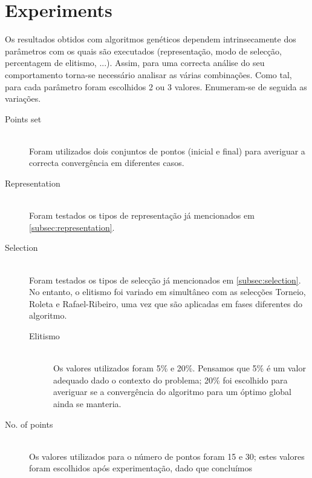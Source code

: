 \documentclass[a4paper]{article}
\begin{document}
\cleardoublepage

\section{Experiments}
\label{sec:experiments}
\indent \indent Os resultados obtidos com algoritmos genéticos dependem intrinsecamente dos parâmetros com os quais são executados
(representação, modo de selecção, percentagem de elitismo, ...). Assim, para uma correcta análise do seu comportamento
torna-se necessário analisar as várias combinações. Como tal, para cada parâmetro foram escolhidos 2 ou 3 valores.
Enumeram-se de seguida as variações.

\begin{description}
	\item [Points set] \hfill \\
		\indent Foram utilizados dois conjuntos de pontos (inicial e final) para averiguar a correcta convergência em diferentes casos.
			\begin{description}
				\item \[ P_{init} = (0.0, 3.0),\quad P_{final} = (4.0, 2.0) \]
				\item \[ P_{init} = (0.0, 3.0),\quad P_{final} = (4.0, 2.8) \]
			\end{description}
	\item [Representation] \hfill \\
		\indent Foram testados os tipos de representação já mencionados em \ref{subsec:representation}.
	\item [Selection] \hfill \\
		\indent Foram testados os tipos de selecção já mencionados em \ref{subsec:selection}. No entanto, o elitismo foi variado em simultâneo com
		as selecções Torneio, Roleta e Rafael-Ribeiro, uma vez que são aplicadas em fases diferentes do algoritmo.
	\begin{description}
		\item [Elitismo] \hfill \\
			\indent Os valores utilizados foram 5\% e 20\%. Pensamos que 5\% é um valor adequado dado o contexto do problema; 20\%
			foi escolhido para averiguar se a convergência do algoritmo para um óptimo global ainda se manteria.
	\end{description}
	\item [No. of points] \hfill \\
		\indent Os valores utilizados para o número de pontos foram 15 e 30; estes valores foram escolhidos após experimentação, dado que concluímos

\end{description}
\end{document}
